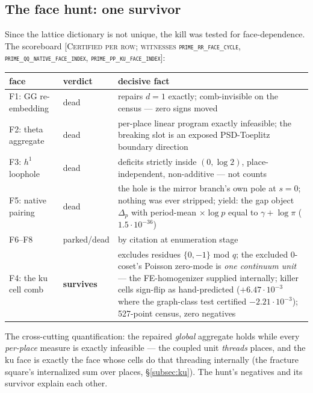 \documentclass[11pt,reqno]{amsart}
\theoremstyle{plain}
\theoremstyle{definition}
\theoremstyle{remark}
\newcommand{\ku}{\mathrm{ku}}
\newcommand{\grade}[1]{\textup{[\textsc{#1}]}}
\begin{document}
\subsection{The face hunt: one survivor}\label{subsec:hunt}

Since the lattice dictionary is not unique, the kill was tested for face-dependence. The
scoreboard \grade{Certified per row; witnesses \texttt{prime\_\allowbreak rr\_\allowbreak face\_\allowbreak cycle},
\texttt{prime\_\allowbreak qq\_\allowbreak native\_\allowbreak face\_\allowbreak index}, \texttt{prime\_\allowbreak pp\_\allowbreak ku\_\allowbreak face\_\allowbreak index}}:

\begin{center}
\small
\begin{tabular}{>{\raggedright\arraybackslash}p{} p{} >{\raggedright\arraybackslash}p{}}
\toprule
\textbf{face} & \textbf{verdict} & \textbf{decisive fact} \\
\midrule
F1: GG re-embedding & dead & repairs $d = 1$ exactly; comb-invisible on the census ---
zero signs moved \\[2pt]
F2: theta aggregate & dead & per-place linear program exactly infeasible; the breaking slot
is an exposed PSD-Toeplitz boundary direction \\[2pt]
F3: $h^1$ loophole & dead & deficits strictly inside $(0, \log 2)$, place-independent,
non-additive --- not counts \\[2pt]
F5: native pairing & dead & the hole is the mirror branch's own pole at $s = 0$; nothing was
ever stripped; yield: the gap object $\Delta_p$ with period-mean $\times \log p$ equal to
$\gamma + \log\pi$ ($1.5\cdot10^{-36}$) \\[2pt]
F6--F8 & parked/dead & by citation at enumeration stage \\[2pt]
F4: the $\ku$ cell comb & \textbf{survives} & excludes residues $\{0, -1\}$ mod $q$; the
excluded $0$-coset's Poisson zero-mode is \emph{one continuum unit} --- the FE-homogenizer
supplied internally; killer cells sign-flip as hand-predicted ($+6.47\cdot10^{-3}$ where the
graph-class test certified $-2.21\cdot10^{-3}$); 527-point census, zero negatives \\
\bottomrule
\end{tabular}
\end{center} The
cross-cutting quantification: the repaired \emph{global} aggregate holds while every
\emph{per-place} measure is exactly infeasible --- the coupled unit \emph{threads} places,
and the $\ku$ face is exactly the face whose cells do that threading internally (the
fracture square's internalized sum over places, \S\ref{subsec:ku}). The hunt's negatives and
its survivor explain each other.
\end{document}
